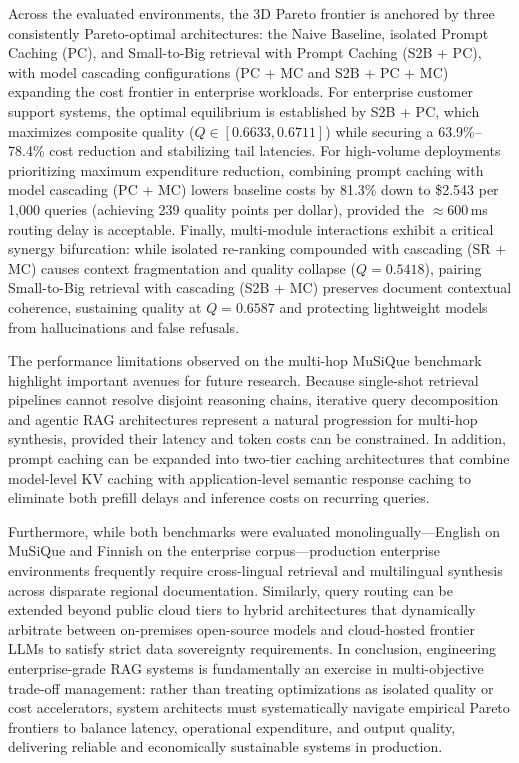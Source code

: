 Across the evaluated environments, the 3D Pareto frontier is anchored by three consistently Pareto-optimal architectures: the Naive Baseline, isolated Prompt Caching (PC), and Small-to-Big retrieval with Prompt Caching (S2B + PC), with model cascading configurations (PC + MC and S2B + PC + MC) expanding the cost frontier in enterprise workloads. For enterprise customer support systems, the optimal equilibrium is established by S2B + PC, which maximizes composite quality ($Q \in [0.6633, 0.6711]$) while securing a 63.9\%--78.4\% cost reduction and stabilizing tail latencies. For high-volume deployments prioritizing maximum expenditure reduction, combining prompt caching with model cascading (PC + MC) lowers baseline costs by 81.3\% down to \$2.543 per 1,000 queries (achieving 239 quality points per dollar), provided the $\approx 600$\,ms routing delay is acceptable. Finally, multi-module interactions exhibit a critical synergy bifurcation: while isolated re-ranking compounded with cascading (SR + MC) causes context fragmentation and quality collapse ($Q = 0.5418$), pairing Small-to-Big retrieval with cascading (S2B + MC) preserves document contextual coherence, sustaining quality at $Q = 0.6587$ and protecting lightweight models from hallucinations and false refusals. 

The performance limitations observed on the multi-hop MuSiQue benchmark highlight important avenues for future research. Because single-shot retrieval pipelines cannot resolve disjoint reasoning chains, iterative query decomposition and agentic RAG architectures represent a natural progression for multi-hop synthesis, provided their latency and token costs can be constrained. In addition, prompt caching can be expanded into two-tier caching architectures that combine model-level KV caching with application-level semantic response caching to eliminate both prefill delays and inference costs on recurring queries.

Furthermore, while both benchmarks were evaluated monolingually---English on MuSiQue and Finnish on the enterprise corpus---production enterprise environments frequently require cross-lingual retrieval and multilingual synthesis across disparate regional documentation. Similarly, query routing can be extended beyond public cloud tiers to hybrid architectures that dynamically arbitrate between on-premises open-source models and cloud-hosted frontier LLMs to satisfy strict data sovereignty requirements. In conclusion, engineering enterprise-grade RAG systems is fundamentally an exercise in multi-objective trade-off management: rather than treating optimizations as isolated quality or cost accelerators, system architects must systematically navigate empirical Pareto frontiers to balance latency, operational expenditure, and output quality, delivering reliable and economically sustainable systems in production.

